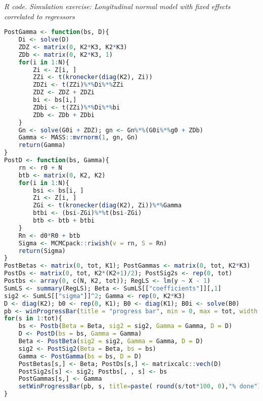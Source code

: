 \begin{enumerate}[leftmargin=*]
\begin{tcolorbox}[enhanced,width=4.67in,center upper,
	fontupper=\large\bfseries,drop shadow southwest,sharp corners]
	\textit{R code. Simulation exercise: Longitudinal normal model with fixed effects correlated to regressors}
	\begin{VF}
		\begin{lstlisting}[language=R]
PostGamma <- function(bs, D){
	Di <- solve(D)
	ZDZ <- matrix(0, K2*K3, K2*K3)
	ZDb <- matrix(0, K2*K3, 1)
	for(i in 1:N){
		Zi <- Z[i, ]
		ZZi <- t(kronecker(diag(K2), Zi))
		ZDZi <- t(ZZi)%*%Di%*%ZZi
		ZDZ <- ZDZ + ZDZi
		bi <- bs[i,]
		ZDbi <- t(ZZi)%*%Di%*%bi
		ZDb <- ZDb + ZDbi
	}
	Gn <- solve(G0i + ZDZ); gn <- Gn%*%(G0i%*%g0 + ZDb)
	Gamma <- MASS::mvrnorm(1, gn, Gn)
	return(Gamma)
}
PostD <- function(bs, Gamma){
	rn <- r0 + N
	btb <- matrix(0, K2, K2)
	for(i in 1:N){
		bsi <- bs[i, ]
		Zi <- Z[i, ]
		ZGi <- t(kronecker(diag(K2), Zi))%*%Gamma
		btbi <- (bsi-ZGi)%*%t(bsi-ZGi)
		btb <- btb + btbi
	}
	Rn <- d0*R0 + btb
	Sigma <- MCMCpack::riwish(v = rn, S = Rn)
	return(Sigma)
}
PostBetas <- matrix(0, tot, K1); PostGammas <- matrix(0, tot, K2*K3)
PostDs <- matrix(0, tot, K2*(K2+1)/2); PostSig2s <- rep(0, tot)
Postbs <- array(0, c(N, K2, tot)); RegLS <- lm(y ~ X - 1)
SumLS <- summary(RegLS); Beta <- SumLS[["coefficients"]][,1]
sig2 <- SumLS[["sigma"]]^2; Gamma <- rep(0, K2*K3)
D <- diag(K2); b0 <- rep(0, K1); B0 <- diag(K1); B0i <- solve(B0) 
pb <- winProgressBar(title = "progress bar", min = 0, max = tot, width = 300)
for(s in 1:tot){
	bs <- Postb(Beta = Beta, sig2 = sig2, Gamma = Gamma, D = D)
	D <- PostD(bs = bs, Gamma = Gamma)
	Beta <- PostBeta(sig2 = sig2, Gamma = Gamma, D = D)
	sig2 <- PostSig2(Beta = Beta, bs = bs)
	Gamma <- PostGamma(bs = bs, D = D) 
	PostBetas[s,] <- Beta; PostDs[s,] <- matrixcalc::vech(D)
	PostSig2s[s] <- sig2; Postbs[, , s] <- bs
	PostGammas[s,] <- Gamma
	setWinProgressBar(pb, s, title=paste( round(s/tot*100, 0),"% done"))
}
\end{lstlisting}
	\end{VF}
\end{tcolorbox}


\end{enumerate}
